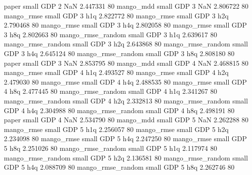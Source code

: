             paper      small      GDP                 2                  NaN 2.447331 80
        mango_mdd      small      GDP                 3                  NaN 2.806722 80
       mango_rmse      small      GDP                 3                  h1q 2.822772 80
       mango_rmse      small      GDP                 3                  h2q 2.790468 80
       mango_rmse      small      GDP                 3                  h4q 2.802058 80
       mango_rmse      small      GDP                 3                  h8q 2.802663 80
mango_rmse_random      small      GDP                 3                  h1q 2.639617 80
mango_rmse_random      small      GDP                 3                  h2q 2.643868 80
mango_rmse_random      small      GDP                 3                  h4q 2.645124 80
mango_rmse_random      small      GDP                 3                  h8q 2.808180 80
            paper      small      GDP                 3                  NaN 2.853795 80
        mango_mdd      small      GDP                 4                  NaN 2.468815 80
       mango_rmse      small      GDP                 4                  h1q 2.493527 80
       mango_rmse      small      GDP                 4                  h2q 2.479030 80
       mango_rmse      small      GDP                 4                  h4q 2.488535 80
       mango_rmse      small      GDP                 4                  h8q 2.477445 80
mango_rmse_random      small      GDP                 4                  h1q 2.341267 80
mango_rmse_random      small      GDP                 4                  h2q 2.332813 80
mango_rmse_random      small      GDP                 4                  h4q 2.304988 80
mango_rmse_random      small      GDP                 4                  h8q 2.498191 80
            paper      small      GDP                 4                  NaN 2.534790 80
        mango_mdd      small      GDP                 5                  NaN 2.262288 80
       mango_rmse      small      GDP                 5                  h1q 2.256057 80
       mango_rmse      small      GDP                 5                  h2q 2.234098 80
       mango_rmse      small      GDP                 5                  h4q 2.247250 80
       mango_rmse      small      GDP                 5                  h8q 2.251026 80
mango_rmse_random      small      GDP                 5                  h1q 2.117974 80
mango_rmse_random      small      GDP                 5                  h2q 2.136581 80
mango_rmse_random      small      GDP                 5                  h4q 2.088709 80
mango_rmse_random      small      GDP                 5                  h8q 2.262746 80
